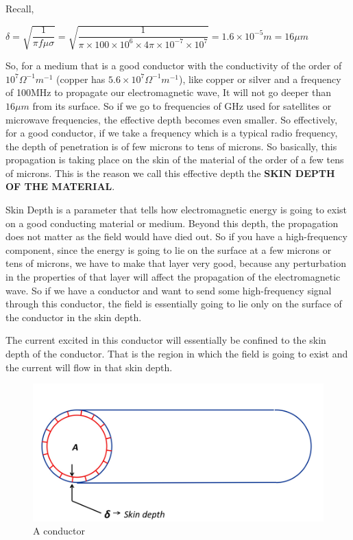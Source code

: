 Recall,

$\delta=\sqrt{\dfrac{1}{\pi f\mu\sigma}}=\sqrt{\dfrac{1}{\pi\times 100\times 10^{6}\times 4\pi\times 10^{-7}\times 10^{7}}}=1.6\times 10^{-5}m=16\mu m$
\\
\begin{equation}\end{equation}

So, for a medium that is a good conductor with the conductivity of the order of  $ 10^{7}\Omega^{-1}m^{-1} $ (copper has $ 5.6 \times 10^{7}\Omega^{-1}m^{-1} $), like copper or silver and a frequency of 100MHz to propagate our electromagnetic wave, It will not go deeper than $16\mu m$ from its surface. So if we go to frequencies of GHz used for satellites or microwave frequencies, the effective depth becomes even smaller. So effectively, for a good conductor, if we take a frequency which is a typical radio frequency, the depth of penetration is of few microns to tens of microns. So basically, this propagation is taking place on the skin of the material of the order of a few tens of microns. This is the reason we call this effective depth the \textbf{SKIN DEPTH OF THE MATERIAL}.

Skin Depth is a parameter that tells how electromagnetic energy is going to exist on a good conducting material or medium. Beyond this depth, the propagation does not matter as the field would have died out. So if you have a high-frequency component, since the energy is going to lie on the surface at a few microns or tens of microns, we have to make that layer very good, because any perturbation in the properties of that layer will affect the propagation of the electromagnetic wave. So if we have a conductor and want to send some high-frequency signal through this conductor, the field is essentially going to lie only on the surface of the conductor in the skin depth.

The current excited in this conductor will essentially be confined to the skin depth of the conductor. That is the region in which the field is going to exist and the current will flow in that skin depth.
\begin{figure}[h]
\centering
\includegraphics[width=1\linewidth]{graphics/skin_depth}
\caption{A conductor}
\end{figure}

